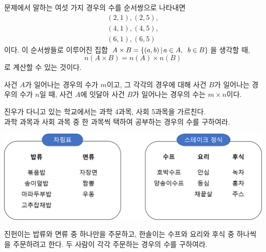\documentclass{oblivoir}
\begin{document}
\bigskip
문제에서 말하는 여섯 가지 경우의 수를 순서쌍으로 나타내면
\begin{gather*}
(2,1),(2,5),\\
(4,1),(4,5),\\
(6,1),(6,5)
\end{gather*}
이다.
이 순서쌍들로 이루어진 집합 \(A\times B=\{(a,b)\,|\, a\in A,\;\;b\in B\}\)을 생각할 때,
\[n(A\times B)=n(A)\times n(B)\]
로 계산할 수 있는 것이다.

\begin{mdframed}
%
\label{law5}
\hspace{-.7em}
사건 \(A\)가 일어나는 경우의 수가 \(m\)이고, 그 각각의 경우에 대해 사건 \(B\)가 일어나는 경우의 수가 \(n\)일 때, 사건 \(A\)에 잇달아 사건 \(B\)가 일어나는 경우의 수는 \(m\times n\)이다.
\end{mdframed}

%
\prob{}\label{law6}
\hspace{-.7em}
진우가 다니고 있는 학교에서는 과학 4과목, 사회 5과목을 가르친다.\\
과학 과목과 사회 과목 중 한 과목씩 택하여 공부하는 경우의 수를 구하여라.

\newpage
%
\label{law7}
\begin{center}
\includegraphics[width=.7\textwidth]{law_7}
\end{center}
진헌이는 밥류와 면류 중 하나만을 주문하고, 한솔이는 수프와 요리와 후식 중 하나씩을 주문하려고 한다.
두 사람이 각각 주문하는 경우의 수를 구하여라.
\end{document}
